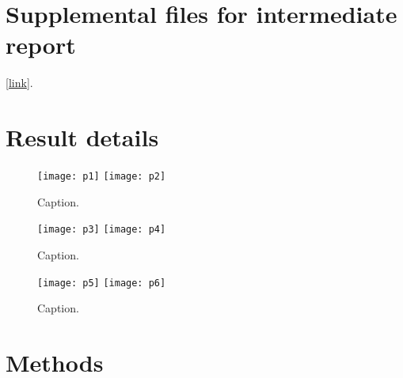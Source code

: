 {}\section{Supplemental files for intermediate report} [\href{https://github.com/DylanLawless/kit_assess/data/processed/}{link}].\markdownRendererInterblockSeparator
{}\section{Result details}\markdownRendererInterblockSeparator
{}\begin{figure}[ht] \hspace*{0cm} \begin{center} \texttt{[image: p1]} \texttt{[image: p2]} \caption{Caption.} \label{fig:p1p2} \end{center} \end{figure}\markdownRendererInterblockSeparator
{}\begin{figure}[ht] \hspace*{0cm} \begin{center} \texttt{[image: p3]} \texttt{[image: p4]} \caption{Caption.} \label{fig:p3p4} \end{center} \end{figure}\markdownRendererInterblockSeparator
{}\begin{figure}[ht] \hspace*{0cm} \begin{center} \texttt{[image: p5]} \texttt{[image: p6]} \caption{Caption.} \label{fig:p5p6} \end{center} \end{figure}\markdownRendererInterblockSeparator
{}\section{Methods}\relax